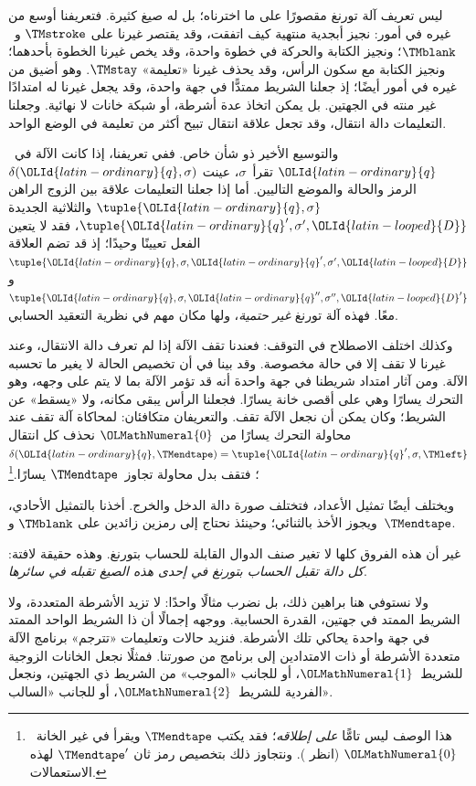 \documentclass[../../../include/open-logic-section]{subfiles}
\begin{document}

ليس تعريف آلة تورنغ مقصورًا على ما اخترناه؛ بل له صيغ كثيرة. فتعريفنا أوسع من غيره في أمور: نجيز أبجدية منتهية كيف اتفقت، وقد يقتصر غيرنا على $\TMstroke$ و~$\TMblank$؛ ونجيز الكتابة والحركة في خطوة واحدة، وقد يخص غيرنا الخطوة بأحدهما؛ ونجيز الكتابة مع سكون الرأس، وقد يحذف غيرنا «تعليمة» $\TMstay$. وهو أضيق من غيره في أمور أيضًا؛ إذ جعلنا الشريط ممتدًّا في جهة واحدة، وقد يجعل غيرنا له امتدادًا غير منته في الجهتين. بل يمكن اتخاذ عدة أشرطة، أو شبكة خانات لا نهائية. وجعلنا التعليمات دالة انتقال، وقد تجعل علاقة انتقال تبيح أكثر من تعليمة في الوضع الواحد.

والتوسيع الأخير ذو شأن خاص. ففي تعريفنا، إذا كانت الآلة في~$\OLId{latin-ordinary}{q}$ تقرأ~$\sigma$، عينت $\delta(\OLId{latin-ordinary}{q},\sigma)$ الرمز والحالة والموضع التاليين. أما إذا جعلنا التعليمات علاقة بين الزوج الراهن $\tuple{\OLId{latin-ordinary}{q},\sigma}$ والثلاثية الجديدة $\tuple{\OLId{latin-ordinary}{q}',\sigma',\OLId{latin-looped}{D}}$، فقد لا يتعين الفعل تعيينًا وحيدًا؛ إذ قد تضم العلاقة $\tuple{\OLId{latin-ordinary}{q},\sigma,\OLId{latin-ordinary}{q}',\sigma',\OLId{latin-looped}{D}}$ و$\tuple{\OLId{latin-ordinary}{q},\sigma,\OLId{latin-ordinary}{q}'',\sigma'',\OLId{latin-looped}{D}'}$ معًا. فهذه آلة تورنغ \emph{غير حتمية}، ولها مكان مهم في نظرية التعقيد الحسابي.

وكذلك اختلف الاصطلاح في التوقف: فعندنا تقف الآلة إذا لم تعرف دالة الانتقال، وعند غيرنا لا تقف إلا في حالة مخصوصة. وقد بينا في  أن تخصيص الحالة لا يغير ما تحسبه الآلة. ومن آثار امتداد شريطنا في جهة واحدة أنه قد تؤمر الآلة بما لا يتم على وجهه، وهو التحرك يسارًا وهي على أقصى خانة يسارًا. فجعلنا الرأس يبقى مكانه، ولا «يسقط» عن الشريط؛ وكان يمكن أن نجعل الآلة تقف. والتعريفان متكافئان: لمحاكاة آلة تقف عند محاولة التحرك يسارًا من~$\OLMathNumeral{0}$ نحذف كل انتقال $\delta(\OLId{latin-ordinary}{q},\TMendtape)=\tuple{\OLId{latin-ordinary}{q}',\sigma,\TMleft}$؛ فتقف بدل محاولة تجاوز~$\TMendtape$ يسارًا.\footnote{هذا الوصف ليس تامًّا \emph{على إطلاقه}؛ فقد يكتب $\TMendtape$ ويقرأ في غير الخانة~$\OLMathNumeral{0}$ (انظر ). ونتجاوز ذلك بتخصيص رمز ثان $\TMendtape'$ لهذه الاستعمالات.}

ويختلف أيضًا تمثيل الأعداد، فتختلف صورة دالة الدخل والخرج. أخذنا بالتمثيل الأحادي، ويجوز الأخذ بالثنائي؛ وحينئذ نحتاج إلى رمزين زائدين على $\TMblank$ و~$\TMendtape$.

غير أن هذه الفروق كلها لا تغير صنف الدوال القابلة للحساب بتورنغ. وهذه حقيقة لافتة: \emph{كل دالة تقبل الحساب بتورنغ في إحدى هذه الصيغ تقبله في سائرها}.

ولا نستوفي هنا براهين ذلك، بل نضرب مثالًا واحدًا: لا تزيد الأشرطة المتعددة، ولا الشريط الممتد في جهتين، القدرة الحسابية. ووجهه إجمالًا أن ذا الشريط الواحد الممتد في جهة واحدة يحاكي تلك الأشرطة. فنزيد حالات وتعليمات «تترجم» برنامج الآلة متعددة الأشرطة أو ذات الامتدادين إلى برنامج من صورتنا. فمثلًا نجعل الخانات الزوجية للشريط~$\OLMathNumeral{1}$، أو للجانب «الموجب» من الشريط ذي الجهتين، ونجعل الفردية للشريط~$\OLMathNumeral{2}$، أو للجانب «السالب».
\end{document}

